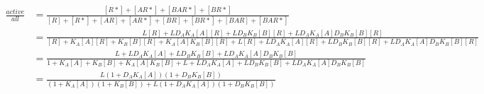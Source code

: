 \begin{equation}\label{eq:2lig_1prot_g}
\begin{split}
\frac{active}{all} &= \frac{[R*] + [AR*] + [BAR*] + [BR*]}{[R] + [R*] + [AR] + [AR*] + [BR] + [BR*] + [BAR] + [BAR*]}\\
&= \frac{L[R] + LD_AK_A[A][R] + LD_BK_B[B][R] + LD_AK_A[A]D_BK_B[B][R]}{[R] + K_A[A][R] + K_B[B][R] + K_A[A]K_B[B][R] + L[R] + LD_AK_A[A][R] + LD_BK_B[B][R] + LD_AK_A[A]D_BK_B[B][R]}\\
&= \frac{L + LD_AK_A[A] + LD_BK_B[B] + LD_AK_A[A]D_BK_B[B]}{1 + K_A[A] + K_B[B] + K_A[A]K_B[B] + L + LD_AK_A[A] + LD_BK_B[B] + LD_AK_A[A]D_BK_B[B]}\\
&= \frac{ L(1 + D_AK_A[A])(1 + D_BK_B[B])}{(1 + K_A[A])(1 + K_B[B]) + L(1 + D_AK_A[A])(1 + D_BK_B[B])}
\end{split}
\end{equation}
